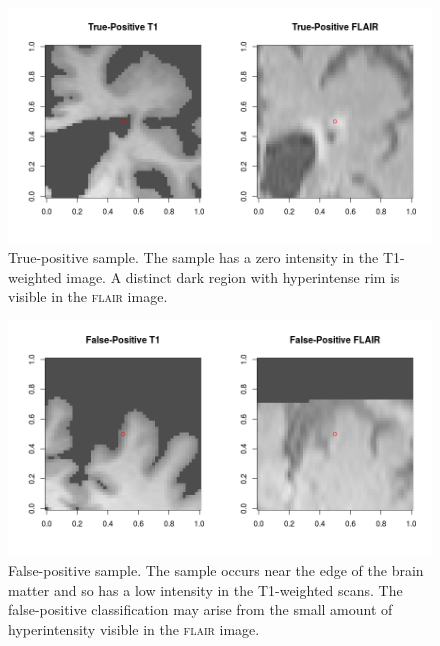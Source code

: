 \begin{figure}[ht]
\centering
\includegraphics[width=\linewidth]{Images/7_TP_t1_flair.png}
\caption{True-positive sample. The sample has a zero intensity in the T1-weighted image. A distinct dark region with hyperintense rim is visible in the \textsc{flair} image.}
\label{results-tp}
\end{figure}

\begin{figure}[ht]
\centering
\includegraphics[width=\linewidth]{Images/7_FP_t1_flair.png}
\caption{False-positive sample. The sample occurs near the edge of the brain matter and so has a low intensity in the T1-weighted scans. The false-positive classification may arise from the small amount of hyperintensity visible in the \textsc{flair} image.}
\label{results-fp1}
\end{figure}

